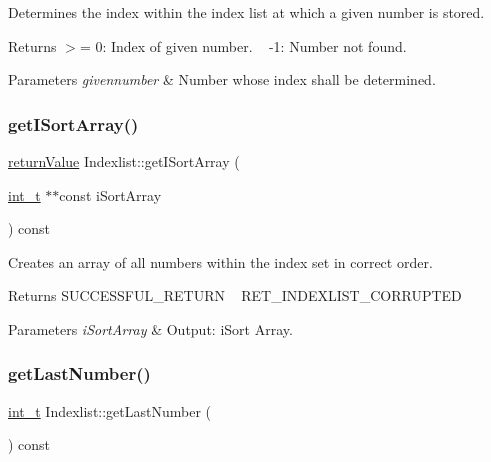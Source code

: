 Determines the index within the index list at which a given number is stored. \begin{DoxyReturn}{Returns}
$>$= 0\+: Index of given number. ~\newline
 -\/1\+: Number not found. 
\end{DoxyReturn}

\begin{DoxyParams}{Parameters}
{\em givennumber} & Number whose index shall be determined. \\
\hline
\end{DoxyParams}
\mbox{\label{class_indexlist_a406fb27db70906d4794df30616e281b6}} 
\subsubsection{\texorpdfstring{get\+I\+Sort\+Array()}{getISortArray()}}
{\footnotesize\ttfamily \hyperlink{_message_handling_8hpp_a81d556f613bfbabd0b1f9488c0fa865e}{return\+Value} Indexlist\+::get\+I\+Sort\+Array (\begin{DoxyParamCaption}\item[{\hyperlink{_types_8hpp_ab6fd6105e64ed14a0c9281326f05e623}{int\+\_\+t} $\ast$$\ast$const}]{i\+Sort\+Array }\end{DoxyParamCaption}) const}

Creates an array of all numbers within the index set in correct order. \begin{DoxyReturn}{Returns}
S\+U\+C\+C\+E\+S\+S\+F\+U\+L\+\_\+\+R\+E\+T\+U\+RN ~\newline
 R\+E\+T\+\_\+\+I\+N\+D\+E\+X\+L\+I\+S\+T\+\_\+\+C\+O\+R\+R\+U\+P\+T\+ED 
\end{DoxyReturn}

\begin{DoxyParams}{Parameters}
{\em i\+Sort\+Array} & Output\+: i\+Sort Array. \\
\hline
\end{DoxyParams}
\mbox{\label{class_indexlist_ade762938b1843833510ab86f2bcd73cf}} 
\subsubsection{\texorpdfstring{get\+Last\+Number()}{getLastNumber()}}
{\footnotesize\ttfamily \hyperlink{_types_8hpp_ab6fd6105e64ed14a0c9281326f05e623}{int\+\_\+t} Indexlist\+::get\+Last\+Number (\begin{DoxyParamCaption}{ }\end{DoxyParamCaption}) const\hspace{0.3cm}{\ttfamily [inline]}}

